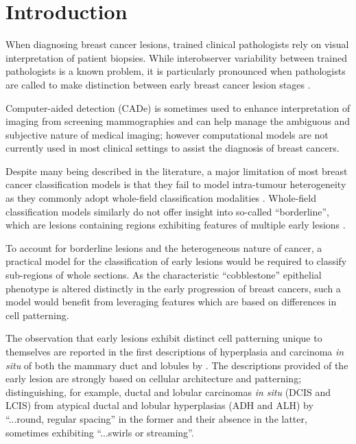 \section{Introduction}

When diagnosing breast cancer lesions, trained clinical pathologists rely on
visual interpretation of patient biopsies. While interobserver variability
between trained pathologists is a known problem, it is particularly pronounced
when pathologists are called to make distinction between early breast cancer
lesion stages \citep{gomes2014}.\par

Computer-aided detection (CADe) is sometimes used to enhance
interpretation of imaging from screening mammographies and can help manage the
ambiguous and subjective nature of medical imaging; however computational models
are not currently used in most clinical settings to assist the diagnosis of breast
cancers.\par

Despite many being described in the literature, a major limitation of most breast
cancer classification models is that they fail to model intra-tumour heterogeneity
as they commonly adopt whole-field classification modalities \citep{pareja2017,weigelt2010}. Whole-field classification models similarly do
not offer insight into so-called ``borderline'', which are lesions containing regions exhibiting features of multiple early lesions \citep{masood2011}.\par

To account for borderline lesions and the heterogeneous nature of cancer, a practical model for the classification of early lesions would be required to classify sub-regions of whole sections. As the characteristic ``cobblestone'' epithelial phenotype is altered distinctly
in the early progression of breast cancers, such a model would benefit from leveraging features which are based on differences in cell patterning.\par

The observation that early lesions exhibit distinct cell patterning unique to themselves are reported in the first descriptions of hyperplasia and carcinoma \textit{in situ} of both the mammary duct and lobules by \cite{page1982}. The descriptions provided of the early lesion are strongly based on cellular architecture and patterning; distinguishing, for example, ductal and lobular carcinomas \emph{in situ} (DCIS and LCIS) from atypical ductal and lobular hyperplasias  (ADH and ALH) by ``...round, regular spacing''  in the former and their absence in the latter, sometimes exhibiting ``...swirls or streaming''.\par

